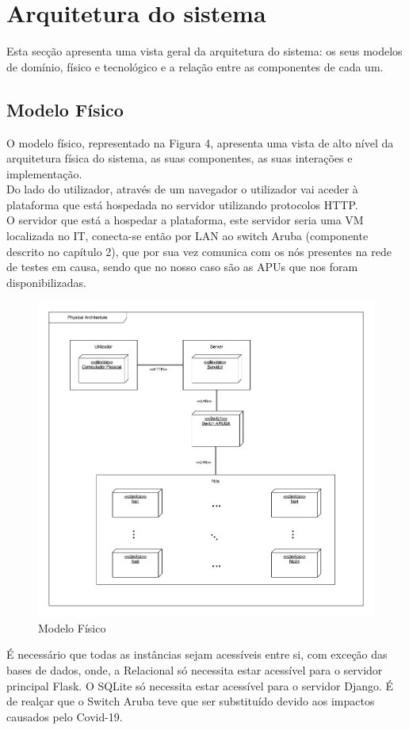 \section{Arquitetura do sistema}
Esta secção apresenta uma vista geral da arquitetura do sistema: os seus modelos de domínio, físico e tecnológico e a relação entre as componentes de cada um.
\subsection{Modelo Físico}
O modelo físico, representado na Figura 4, apresenta uma vista de alto nível da arquitetura física do sistema, as suas componentes, as suas interações e implementação. \newline\\
Do lado do utilizador, através de um navegador o utilizador vai aceder à plataforma que está hospedada no servidor utilizando protocolos HTTP.\newline\\
O servidor que está a hospedar a plataforma, este servidor seria uma VM localizada no IT, conecta-se então por LAN ao switch Aruba (componente descrito no capítulo 2), que por sua vez comunica com os nós presentes na rede de testes em causa, sendo que no nosso caso são as APUs que nos foram disponibilizadas.\hfill
\begin{figure}[!ht]
    \centering
    \includegraphics[height=0.63\textheight, width=1\textwidth]{images/physical_arch.png}
    \caption{Modelo Físico}
    \label{fig:fisico}
\end{figure}
É necessário que todas  as instâncias sejam acessíveis entre si, com exceção das bases de dados, onde, a Relacional só necessita estar acessível para o servidor principal Flask. O SQLite só necessita estar acessível para o servidor Django. É de realçar que o Switch Aruba teve que ser substituído devido aos impactos causados pelo Covid-19.

